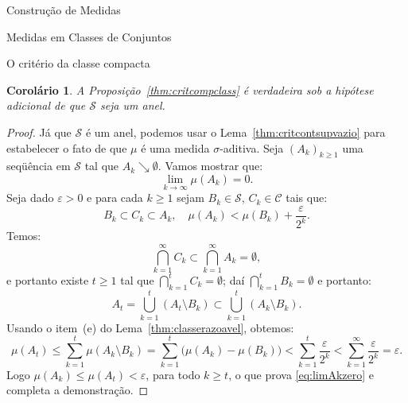 \documentclass[oneside,final,11pt]{amsbook}
\theoremstyle{remark}\newtheorem{exercise}{Exercício}[chapter]
\theoremstyle{remark}\newtheorem{*exercise}[exercise]{\hbox to 0pt{\hskip 0pt minus 1fil*}Exercício}
\theoremstyle{definition}\newtheorem{exdefin}{Definição}[chapter]
\theoremstyle{plain}\newtheorem{teo}{Teorema}[section]
\theoremstyle{plain}\newtheorem{lem}[teo]{Lema}
\theoremstyle{plain}\newtheorem{prop}[teo]{Proposição}
\theoremstyle{plain}\newtheorem{cor}[teo]{Corolário}
\theoremstyle{definition}\newtheorem{defin}[teo]{Definição}
\theoremstyle{remark}\newtheorem{rem}[teo]{Observação}
\theoremstyle{definition}\newtheorem{notation}[teo]{Notação}
\theoremstyle{definition}\newtheorem{convention}[teo]{Convenção}
\theoremstyle{definition}\newtheorem{example}[teo]{Exemplo}
\numberwithin{section}{chapter}
\numberwithin{equation}{section}
\begin{document}
\begin{chapter}{Construção de Medidas}
\begin{section}{Medidas em Classes de Conjuntos}
\begin{subsection}{O critério da classe compacta}
\begin{cor}\label{thm:critcompclassanel}
A Proposição~\ref{thm:critcompclass} é verdadeira sob a hipótese adicional de que
$\mathcal S$ seja um anel.
\end{cor}
\begin{proof}
Já que $\mathcal S$ é um anel, podemos usar o Lema~\ref{thm:critcontsupvazio} para
estabelecer o fato de que $\mu$ é uma medida $\sigma$-aditiva. Seja $(A_k)_{k\ge1}$
uma seqüência em $\mathcal S$ tal que $A_k\searrow\emptyset$. Vamos mostrar que:
\begin{equation}\label{eq:limAkzero}
\lim_{k\to\infty}\mu(A_k)=0.
\end{equation}
Seja dado $\varepsilon>0$ e para cada $k\ge1$ sejam
$B_k\in\mathcal S$, $C_k\in\mathcal C$ tais que:
\[B_k\subset C_k\subset A_k,\quad\mu(A_k)<\mu(B_k)+\frac\varepsilon{2^k}.\]
Temos:
\[\bigcap_{k=1}^\infty C_k\subset\bigcap_{k=1}^\infty A_k=\emptyset,\]
e portanto existe $t\ge1$ tal que $\bigcap_{k=1}^tC_k=\emptyset$; daí $\bigcap_{k=1}^tB_k=\emptyset$
e portanto:
\[A_t=\bigcup_{k=1}^t(A_t\setminus B_k)\subset\bigcup_{k=1}^t(A_k\setminus B_k).\]
Usando o item~(e) do Lema~\ref{thm:classerazoavel}, obtemos:
\[\mu(A_t)\le\sum_{k=1}^t\mu(A_k\setminus B_k)=\sum_{k=1}^t\big(\mu(A_k)-\mu(B_k)\big)
<\sum_{k=1}^t\frac\varepsilon{2^k}<\sum_{k=1}^\infty\frac\varepsilon{2^k}=\varepsilon.\]
Logo $\mu(A_k)\le\mu(A_t)<\varepsilon$, para todo $k\ge t$, o que prova \eqref{eq:limAkzero}
e completa a demonstração.
\end{proof}


\end{subsection}
\end{section}
\end{chapter}
\end{document}

